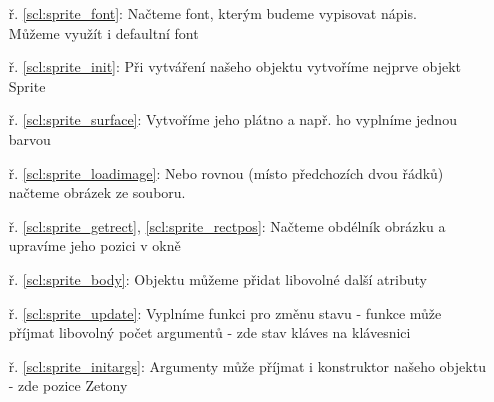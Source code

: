 \begin{minipage}[t]{.45\textwidth}
\begin{enumerate}
\item[ř. \ref{scl:sprite_font}:] Načteme font, kterým budeme vypisovat nápis.\\Můžeme využít i defaultní font
\item[ř. \ref{scl:sprite_init}:] Při vytváření našeho objektu vytvoříme nejprve objekt Sprite
\item[ř. \ref{scl:sprite_surface}:] Vytvoříme jeho plátno a např. ho vyplníme jednou barvou
\vspace{2cm}
\item[ř. \ref{scl:sprite_loadimage}:] Nebo rovnou (místo předchozích dvou řádků) načteme obrázek ze souboru.
\item[ř. \ref{scl:sprite_getrect}, \ref{scl:sprite_rectpos}:] Načteme obdélník obrázku a upravíme jeho pozici v okně
\item[ř. \ref{scl:sprite_body}:] Objektu můžeme přidat libovolné další atributy
\vspace{3cm}
\item[ř. \ref{scl:sprite_update}:] Vyplníme funkci pro změnu stavu - funkce může příjmat libovolný počet argumentů - zde stav kláves na klávesnici
\item[ř. \ref{scl:sprite_initargs}:] Argumenty může příjmat i konstruktor našeho objektu - zde pozice Zetony

\end{enumerate}
\end{minipage}

